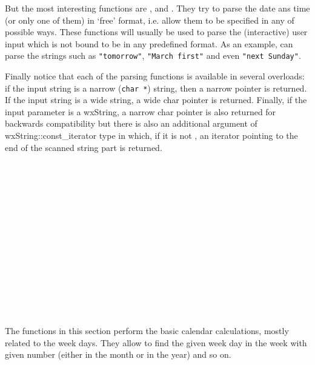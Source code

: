But the most interesting functions are
,
 and
. They try to parse the date
ans time (or only one of them) in `free' format, i.e. allow them to be
specified in any of possible ways. These functions will usually be used to
parse the (interactive) user input which is not bound to be in any predefined
format. As an example,  can
parse the strings such as {\tt "tomorrow"}, {\tt "March first"} and even
{\tt "next Sunday"}.

Finally notice that each of the parsing functions is available in several
overloads: if the input string is a narrow (\texttt{char *}) string, then a
narrow pointer is returned. If the input string is a wide string, a wide char
pointer is returned. Finally, if the input parameter is a wxString, a narrow
char pointer is also returned for backwards compatibility but there is also an
additional argument of wxString::const\_iterator type in which, if it is not
\NULL, an iterator pointing to the end of the scanned string part is returned.

\\
\\
\\
\\
\\
\\
\\
\\
\\
\\
\\
\\
\\


\label{datetimecalculations}

The functions in this section perform the basic calendar calculations, mostly
related to the week days. They allow to find the given week day in the
week with given number (either in the month or in the year) and so on.

